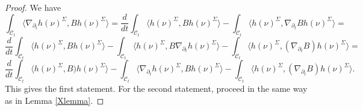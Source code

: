 \documentclass[10pt]{amsart}
\newcommand{\Si}{\Sigma}
\newcommand{\cC}{{\mathcal C}}
\newcommand{\p}{\partial}
\newcommand{\<}{\langle}
\renewcommand{\>}{\rangle}
\theoremstyle{plain}
\theoremstyle{remark}
\theoremstyle{definition}
\numberwithin{equation}{section}
\begin{document}
\begin{proof}
We have 
$$\int_{\cC_t}\<\nabla_{\p_t} h(\nu)^{\Si}, Bh(\nu)^{\Si}\> = \frac{d}{dt}\int_{\cC_t}\<h(\nu)^{\Si}, Bh(\nu)^{\Si}\> - \int_{\cC_t}\<h(\nu)^{\Si}, 
\nabla_{\p_t} Bh(\nu)^{\Si}\> = $$
$$\frac{d}{dt}\int_{\cC_t}\<h(\nu)^{\Si}, Bh(\nu)^{\Si}\> - \int_{\cC_t}\<h(\nu)^{\Si}, B\nabla_{\p_t} h(\nu)^{\Si}\> - \int_{\cC_t}\<h(\nu)^{\Si}, 
(\nabla_{\p_t} B)h(\nu)^{\Si}\> = $$
$$\frac{d}{dt}\int_{\cC_t}\<h(\nu)^{\Si}, B)h(\nu)^{\Si}\> - \int_{\cC_t}\<\nabla_{\p_t} h(\nu)^{\Si}, Bh(\nu)^{\Si}\> - \int_{\cC_t}\<h(\nu)^{\Si}, 
(\nabla_{\p_t} B)h(\nu)^{\Si}\> .$$
This gives the first statement. For the second statement, proceed in the same way as in Lemma \ref{Xlemma}. 

\end{proof}







\end{document}
